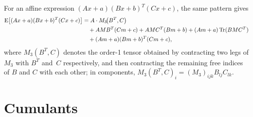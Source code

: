 For an affine expression $(Ax+a)(Bx+b)^T(Cx+c)$, the same pattern gives
\begin{align*}
   \mathrm{E}\!\left[(Ax+a)(Bx+b)^T(Cx+c)\right]
   &= A\cdot M_3\!\!\left(B^T, C\right)
   \\&\quad+ AMB^T(Cm+c) + AMC^T(Bm+b) + (Am+a)\,\mathrm{Tr}(BMC^T)
   \\&\quad+ (Am+a)(Bm+b)^T(Cm+c),
\end{align*}
where $M_3(B^T, C)$ denotes the order-1 tensor obtained by contracting two legs of $M_3$ with $B^T$ and~$C$ respectively, and then contracting the remaining free indices of $B$ and $C$ with each other; in components, $M_3(B^T, C)_i = (M_3)_{ijk} B_{lj} C_{lk}$.


\section{Cumulants}
\label{sec:cumulants}

